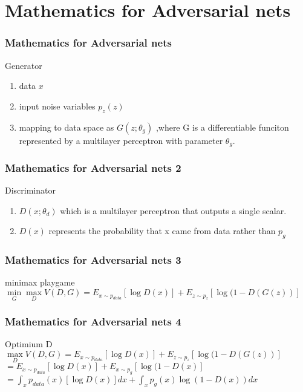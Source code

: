 \documentclass{beamer}[10]
\begin{document}
\section{Mathematics for Adversarial nets}
\begin{frame}
  \frametitle{Mathematics for Adversarial nets}
  \begin{block}{Generator}
  \begin{enumerate}
    \item data $x$
    \item input noise variables $p_z(z)$
    \item mapping to data space as $G(z;\theta_g)$ ,where G is a differentiable funciton represented by a multilayer perceptron with parameter $\theta_g$.
  \end{enumerate}
\end{block}
\end{frame}

\begin{frame}
  \frametitle{Mathematics for Adversarial nets 2}
  \begin{block}{Discriminator}
  \begin{enumerate}
    \item $D(x;\theta_d)$ which is a multilayer perceptron that outputs a single scalar.
    \item $D(x)$ represents the probability that x came from data rather than $p_g$
  \end{enumerate}
  \end{block}
\end{frame}

\begin{frame}
  \frametitle{Mathematics for Adversarial nets 3}
  \begin{block}{minimax playgame}
    $\min \limits_{G} \max \limits_{D} V(D,G) = E_{x \sim p_{data}}[\log D(x)] + E_{z \sim p_z}[\log (1 - D(G(z))] $
  \end{block}
\end{frame}

\begin{frame}
  \frametitle{Mathematics for Adversarial nets 4}
  \begin{block}{Optimium D }
    $\max \limits_{D} V(D,G) = E_{x \sim p_{data}}[\log D(x)] + E_{z \sim p_z}[\log (1 - D(G(z))] $ 
                            $= E_{x \sim p_{data}}[\log D(x)] + E_{x \sim p_g}[\log (1 - D(x)]     $ 
			    $= \int_{x} p_{data}(x)[\log D(x)] dx + \int_{x} p_g(x) \log (1 - D(x)) dx $
  \end{block}
\end{frame}
\end{document}

